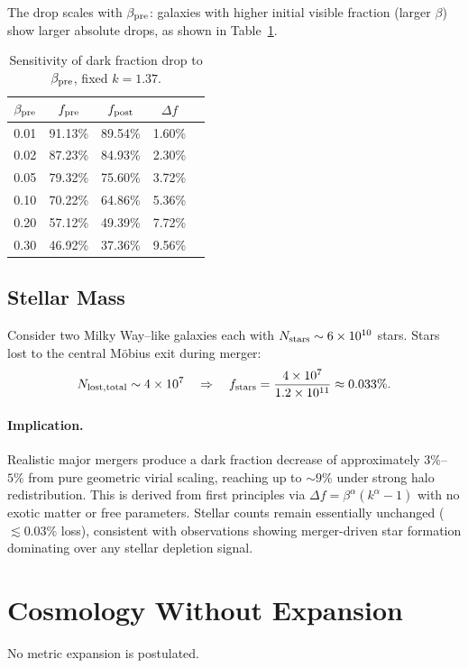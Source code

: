 \documentclass[11pt,a4paper]{article}
\begin{document}
The drop scales with $\beta_{\rm pre}$: galaxies with higher initial visible
fraction (larger $\beta$) show larger absolute drops, as shown in
Table~\ref{tab:merger-sensitivity}.

\begin{table}[h]
\centering
\caption{Sensitivity of dark fraction drop to $\beta_{\rm pre}$, fixed $k = 1.37$.}
\begin{tabular}{ccccc}
\hline
$\beta_{\rm pre}$ & $f_{\rm pre}$ & $f_{\rm post}$ & $\Delta f$ \\
\hline
0.01 & 91.13\% & 89.54\% & 1.60\% \\
0.02 & 87.23\% & 84.93\% & 2.30\% \\
0.05 & 79.32\% & 75.60\% & 3.72\% \\
0.10 & 70.22\% & 64.86\% & 5.36\% \\
0.20 & 57.12\% & 49.39\% & 7.72\% \\
0.30 & 46.92\% & 37.36\% & 9.56\% \\
\hline
\end{tabular}
\label{tab:merger-sensitivity}
\end{table}

\subsection{Stellar Mass}

Consider two Milky Way--like galaxies each with $N_{\rm stars} \sim 6 \times
10^{10}$ stars. Stars lost to the central Möbius exit during merger:
\[
N_{\rm lost, total} \sim 4 \times 10^7 \quad \Rightarrow \quad
f_{\rm stars} = \frac{4 \times 10^7}{1.2 \times 10^{11}} \approx 0.033\%.
\]

\paragraph{Implication.}
Realistic major mergers produce a dark fraction decrease of approximately
$3\%$--$5\%$ from pure geometric virial scaling, reaching up to $\sim 9\%$
under strong halo redistribution. This is derived from first principles via
$\Delta f = \beta^\alpha(k^\alpha - 1)$ with no exotic matter or free
parameters. Stellar counts remain essentially unchanged ($\lesssim 0.03\%$
loss), consistent with observations showing merger-driven star formation
dominating over any stellar depletion signal.

\section{Cosmology Without Expansion}
No metric expansion is postulated.
\end{document}
